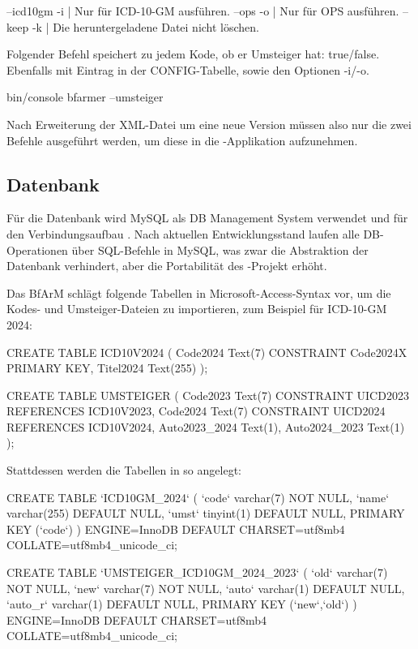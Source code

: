 \begin{Code}
--icd10gm -i | Nur für ICD-10-GM ausführen.
--ops     -o | Nur für OPS ausführen.
--keep    -k | Die heruntergeladene Datei nicht löschen. 
\end{Code}

Folgender Befehl speichert zu jedem Kode, ob er Umsteiger hat: true/false. Ebenfalls mit Eintrag in der CONFIG-Tabelle, sowie den Optionen -i/-o. 

\begin{Code}
bin/console bfarmer --umsteiger
\end{Code}

Nach Erweiterung der XML-Datei um eine neue Version müssen also nur die zwei Befehle ausgeführt werden, um diese in die \bfarmer-Applikation aufzunehmen. 

\subsection{Datenbank}

Für die Datenbank wird MySQL \cite{mysql} als DB Management System verwendet und für den Verbindungsaufbau \cite{doctrine}. Nach aktuellen Entwicklungsstand laufen alle DB-Operationen über SQL-Befehle in MySQL, was zwar die Abstraktion der Datenbank verhindert, aber die Portabilität des \bfarmer-Projekt erhöht. 

Das BfArM schlägt folgende Tabellen in Microsoft-Access-Syntax vor, um die Kodes- und Umsteiger-Dateien zu importieren, zum Beispiel für ICD-10-GM 2024:

\begin{Code}
CREATE TABLE ICD10V2024 (
     Code2024   Text(7)    CONSTRAINT Code2024X PRIMARY KEY,
     Titel2024  Text(255)  
);

CREATE TABLE UMSTEIGER (
     Code2023       Text(7) CONSTRAINT UICD2023  REFERENCES ICD10V2023,
     Code2024       Text(7) CONSTRAINT UICD2024  REFERENCES ICD10V2024,
     Auto2023_2024  Text(1),
     Auto2024_2023  Text(1)
);
\end{Code}


Stattdessen werden die Tabellen in \bfarmer so angelegt:

\begin{Code}
CREATE TABLE `ICD10GM_2024` (
  `code` varchar(7) NOT NULL,
  `name` varchar(255) DEFAULT NULL,
  `umst` tinyint(1) DEFAULT NULL,
  PRIMARY KEY (`code`)
) ENGINE=InnoDB DEFAULT CHARSET=utf8mb4 COLLATE=utf8mb4_unicode_ci;

CREATE TABLE `UMSTEIGER_ICD10GM_2024_2023` (
  `old` varchar(7) NOT NULL,
  `new` varchar(7) NOT NULL,
  `auto` varchar(1) DEFAULT NULL,
  `auto_r` varchar(1) DEFAULT NULL,
  PRIMARY KEY (`new`,`old`)
) ENGINE=InnoDB DEFAULT CHARSET=utf8mb4 COLLATE=utf8mb4_unicode_ci;
\end{Code}

